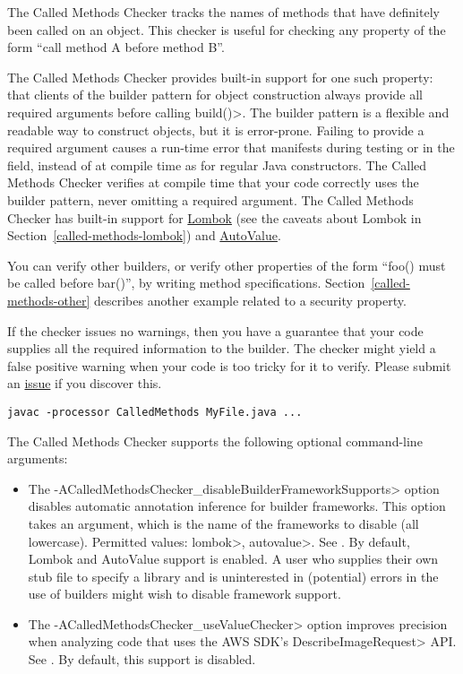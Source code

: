 \htmlhr
{}

The Called Methods Checker tracks the names of methods that have definitely
been called on an object. This checker is useful for checking any property
of the form ``call method A before method B''.

The Called Methods Checker provides built-in support for one such property:
that clients of the builder pattern for object
construction always provide all required arguments before calling
\<build()>.  The builder pattern is a flexible and readable way to
construct objects, but it is error-prone.  Failing to provide
a required argument causes a run-time error that manifests during testing
or in the field, instead of at compile time as for regular Java
constructors.  The Called Methods Checker verifies at compile time that
your code correctly uses the builder pattern, never omitting a required
argument. The Called Methods Checker has built-in support for
\href{https://projectlombok.org/}{Lombok} (see the caveats about Lombok in
Section~\ref{called-methods-lombok}) and
\href{https://github.com/google/auto/blob/master/value/userguide/index.md}{AutoValue}.

You can verify other builders, or verify other properties of the form
``foo() must be called before bar()'', by writing method specifications.
Section~\ref{called-methods-other} describes another example related to a
security property.

If the checker issues no warnings, then you have a guarantee that your code
supplies all the required information to the builder.  The checker might
yield a false positive warning when your code is too tricky for it to
verify.  Please submit an
\href{https://github.com/typetools/checker-framework/issues}{issue} if you
discover this.



\begin{Verbatim}
javac -processor CalledMethods MyFile.java ...
\end{Verbatim}

The Called Methods Checker supports the following optional command-line arguments:
\begin{itemize}
\item The \<-ACalledMethodsChecker\_disableBuilderFrameworkSupports> option disables automatic
 annotation inference for builder frameworks. This option
 takes an argument, which is the name of the frameworks to disable (all lowercase). Permitted values:
 \<lombok>, \<autovalue>. See . By default,
 Lombok and AutoValue support is enabled. A user who supplies their own stub file to specify
 a library and is uninterested in (potential) errors in the use of builders might wish to disable framework
 support.
\item The \<-ACalledMethodsChecker\_useValueChecker> option improves precision when analyzing
 code that uses the AWS SDK's \<DescribeImageRequest> API. See .
 By default, this support is disabled.
\end{itemize}

